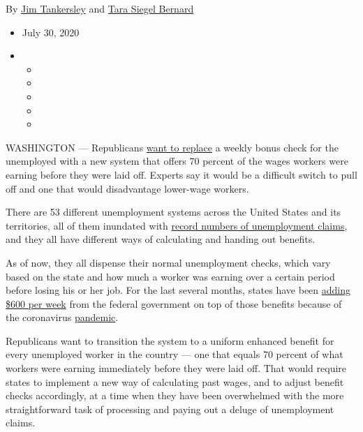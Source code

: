 By \href{https://www.nytimes.com/by/jim-tankersley}{Jim Tankersley} and
\href{https://www.nytimes.com/by/tara-siegel-bernard}{Tara Siegel
Bernard}

\begin{itemize}
\item
  July 30, 2020
\item
  \begin{itemize}
  \item
  \item
  \item
  \item
  \item
  \end{itemize}
\end{itemize}

WASHINGTON --- Republicans
\href{https://www.nytimes.com/2020/07/23/business/economy/unemployment-benefits.html}{want
to replace} a weekly bonus check for the unemployed with a new system
that offers 70 percent of the wages workers were earning before they
were laid off. Experts say it would be a difficult switch to pull off
and one that would disadvantage lower-wage workers.

There are 53 different unemployment systems across the United States and
its territories, all of them inundated with
\href{https://www.nytimes.com/interactive/2020/05/08/business/economy/april-jobs-report.html}{record
numbers of unemployment claims}, and they all have different ways of
calculating and handing out benefits.

As of now, they all dispense their normal unemployment checks, which
vary based on the state and how much a worker was earning over a certain
period before losing his or her job. For the last several months, states
have been
\href{https://www.nytimes.com/2020/07/29/business/economy/unemployment-benefits-coronavirus.html}{adding
\$600 per week} from the federal government on top of those benefits
because of the coronavirus
\href{https://www.nytimes.com/2020/07/21/business/economy/coronavirus-unemployment-benefits.html}{pandemic}.

Republicans want to transition the system to a uniform enhanced benefit
for every unemployed worker in the country --- one that equals 70
percent of what workers were earning immediately before they were laid
off. That would require states to implement a new way of calculating
past wages, and to adjust benefit checks accordingly, at a time when
they have been overwhelmed with the more straightforward task of
processing and paying out a deluge of unemployment claims.


